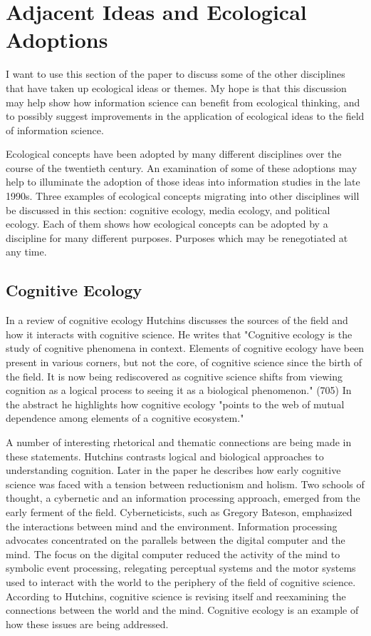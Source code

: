 \section{Adjacent Ideas and Ecological Adoptions}

I want to use this section of the paper to discuss some of the other disciplines that have taken up ecological ideas or themes. My hope is that this discussion may help show how information science can benefit from ecological thinking, and to possibly suggest improvements in the application of ecological ideas to the field of information science.

Ecological concepts have been adopted by many different disciplines over the course of the twentieth century. An examination of some of these adoptions may help to illuminate the adoption of those ideas into information studies in the late 1990s. Three examples of ecological concepts migrating into other disciplines will be discussed in this section: cognitive ecology, media ecology, and political ecology. Each of them shows how ecological concepts can be adopted by a discipline for many different purposes. Purposes which may be renegotiated at any time.

\subsection{Cognitive Ecology}

In a review of cognitive ecology Hutchins \citep{hutchins_cognitive_2010} discusses the sources of the field and how it interacts with cognitive science. He writes that "Cognitive ecology is the study of cognitive phenomena in context. Elements of cognitive ecology have been present in various corners, but not the core, of cognitive science since the birth of the field. It is now being rediscovered as cognitive science shifts from viewing cognition as a logical process to seeing it as a biological phenomenon." (705) In the abstract he highlights how cognitive ecology "points to the web of mutual dependence among elements of a cognitive ecosystem."

A number of interesting rhetorical and thematic connections are being made in these statements. Hutchins contrasts logical and biological approaches to understanding cognition. Later in the paper he describes how early cognitive science was faced with a tension between reductionism and holism. Two schools of thought, a cybernetic and an information processing approach, emerged from the early ferment of the field. Cyberneticists, such as Gregory Bateson, emphasized the interactions between mind and the environment. Information processing advocates concentrated on the parallels between the digital computer and the mind. The focus on the digital computer reduced the activity of the mind to symbolic event processing, relegating perceptual systems and the motor systems used to interact with the world to the periphery of the field of cognitive science. According to Hutchins, cognitive science is revising itself and reexamining the connections between the world and the mind. Cognitive ecology is an example of how these issues are being addressed.

